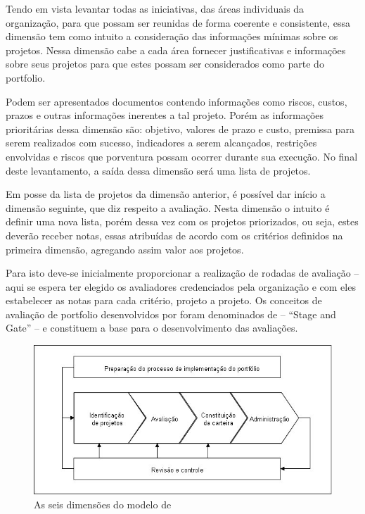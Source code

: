 \documentclass[12pt,a4paper,ruledheader,tocpage=prefix,floatnumber=continuous,pagestart=folhaderosto,font=times]{abnt}
\begin{document}
Tendo em vista levantar todas as iniciativas, das áreas individuais da organização, para que possam ser reunidas de forma coerente e consistente, essa 
dimensão tem como intuito a consideração das informações mínimas sobre os projetos. Nessa dimensão cabe a cada área fornecer justificativas e informações
sobre seus projetos para que estes possam ser considerados como parte do portfolio. 

Podem ser apresentados documentos contendo informações como riscos, custos, prazos e outras informações inerentes a tal projeto. Porém as informações 
prioritárias dessa dimensão são: objetivo, valores de prazo e custo, premissa para serem realizados com sucesso, indicadores a serem alcançados, 
restrições envolvidas e riscos que porventura possam ocorrer durante sua execução. No final deste levantamento, a saída dessa dimensão será uma lista de 
projetos.

Em posse da lista de projetos da dimensão anterior, é possível dar início a dimensão seguinte, que diz respeito a avaliação. Nesta dimensão o intuito é 
definir uma nova lista, porém dessa vez com os projetos priorizados, ou seja, estes deverão receber notas, essas atribuídas de acordo com os critérios 
definidos na primeira dimensão, agregando assim valor aos projetos. 

Para isto deve-se inicialmente proporcionar a realização de rodadas de avaliação – aqui se espera ter elegido os avaliadores credenciados pela organização 
e com eles estabelecer as notas para cada critério, projeto a projeto. Os conceitos de avaliação de portfolio desenvolvidos por \cite{cooper} foram 
denominados de – ``Stage and Gate'' – e constituem a base para o desenvolvimento das avaliações.

\begin{figure}[H]
\centering
\includegraphics[width=.9\textwidth]{rabechini.jpg}
\caption{As seis dimensões do modelo de \cite{rabechini}}
\label{fig:exampleFig1}
\end{figure}
\end{document}
